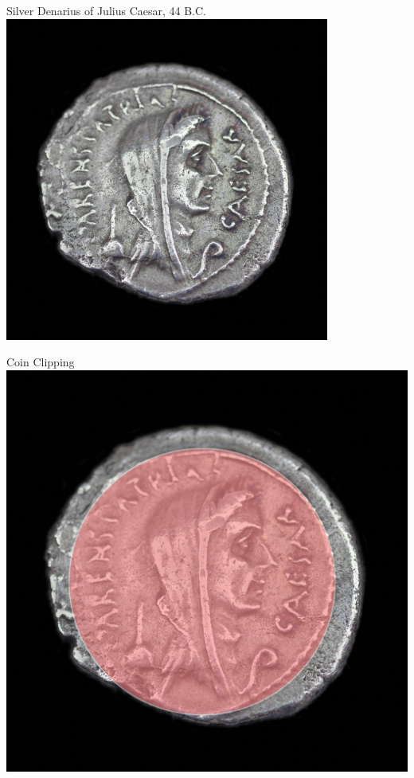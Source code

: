 \begin{frame}{Silver Denarius of Julius Caesar, 44 B.C.}
    \centering
    \includegraphics[width=0.8\textwidth]{img/denarius.png} \\
\end{frame}

\begin{frame}{Coin Clipping}
    \centering
    \includegraphics[height=0.6\textwidth]{img/denarius-clipping.png} \\
\end{frame}

